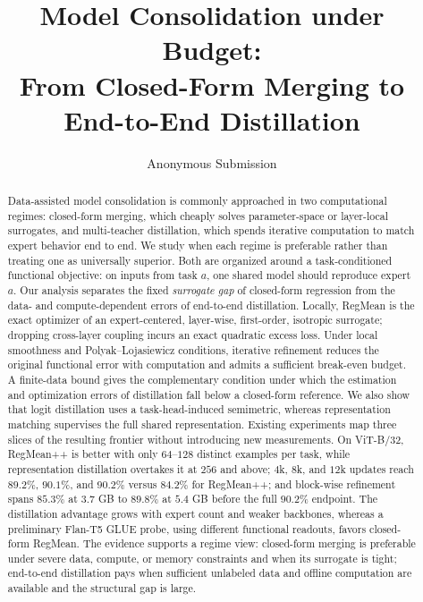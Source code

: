 \documentclass[letterpaper]{article} %
\title{Model Consolidation under Budget:\\
From Closed-Form Merging to End-to-End Distillation}
\author{Anonymous Submission}
\theoremstyle{plain}
\theoremstyle{definition}
\begin{document}
\maketitle

\begin{abstract}
Data-assisted model consolidation is commonly approached in two computational regimes:
closed-form merging, which cheaply solves parameter-space or layer-local surrogates, and
multi-teacher distillation, which spends iterative computation to match expert behavior
end to end. We study when each regime is preferable rather than treating one as universally
superior. Both are organized around a task-conditioned functional objective: on inputs from
task $a$, one shared model should reproduce expert $a$. Our analysis separates the fixed
\emph{surrogate gap} of closed-form regression from the data- and compute-dependent errors
of end-to-end distillation. Locally, RegMean is the exact optimizer of an expert-centered,
layer-wise, first-order, isotropic surrogate; dropping cross-layer coupling incurs an exact
quadratic excess loss. Under local smoothness and Polyak--Lojasiewicz conditions, iterative
refinement reduces the original functional error with computation and admits a sufficient
break-even budget. A finite-data bound gives the complementary condition under which the
estimation and optimization errors of distillation fall below a closed-form reference.
We also show that logit distillation uses a task-head-induced semimetric, whereas
representation matching supervises the full shared representation. Existing experiments
map three slices of the resulting frontier without introducing new measurements. On
ViT-B/32, RegMean++ is better with only $64$--$128$ distinct examples per task, while
representation distillation overtakes it at $256$ and above; $4$k, $8$k, and $12$k updates
reach $89.2\%$, $90.1\%$, and $90.2\%$ versus $84.2\%$ for RegMean++; and block-wise
refinement spans $85.3\%$ at $3.7$ GB to $89.8\%$ at $5.4$ GB before the full $90.2\%$
endpoint. The distillation advantage grows with expert count and weaker backbones, whereas a
preliminary Flan-T5 GLUE probe, using different functional readouts, favors closed-form
RegMean. The evidence
supports a regime view: closed-form merging is preferable under severe data, compute, or
memory constraints and when its surrogate is tight; end-to-end distillation pays when
sufficient unlabeled data and offline computation are available and the structural gap is
large.
\end{abstract}
\end{document}
